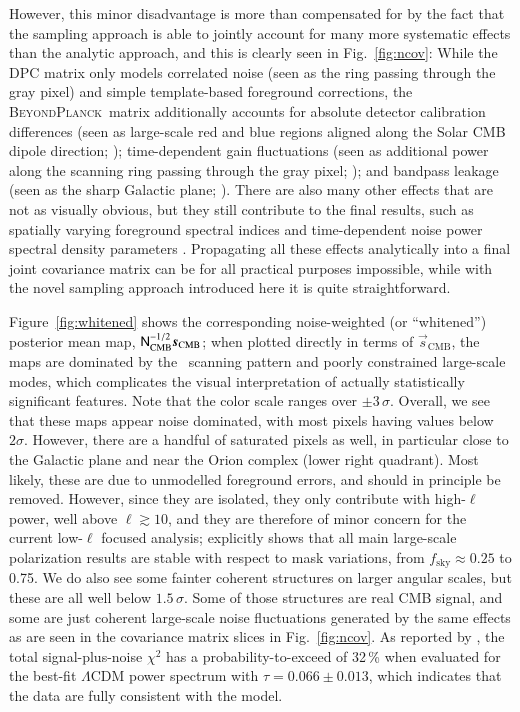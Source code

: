 \documentclass[twocolumn]{aa}
\newcommand{\s}[0]{\vec{s}}
\newcommand{\N}[0]{\tens{N}}
\newcommand{\BP}{\textsc{BeyondPlanck}}
\begin{document}
However, this minor disadvantage is more than compensated for by the
fact that the sampling approach is able to jointly account for many
more systematic effects than the analytic approach, and this is
clearly seen in Fig.~\ref{fig:ncov}: While the DPC matrix only models
correlated noise (seen as the ring passing through the gray pixel) and
simple template-based foreground corrections, the \BP\ matrix
additionally accounts for absolute detector calibration differences
(seen as large-scale red and blue regions aligned along the Solar CMB
dipole direction; \citealp{bp07,bp10}); time-dependent gain
fluctuations (seen as additional power along the scanning ring passing
through the gray pixel; \citealp{bp07}); and bandpass leakage (seen as
the sharp Galactic plane; \citealp{bp09}). There are also many other
effects that are not as visually obvious, but they still contribute to
the final results, such as spatially varying foreground spectral
indices \citep{bp13,bp14} and time-dependent noise power spectral
density parameters \citep{bp06}. Propagating all these effects
analytically into a final joint covariance matrix can be for all practical
purposes impossible, while with the novel sampling approach introduced
here it is quite straightforward.

Figure~\ref{fig:whitened} shows the corresponding noise-weighted (or
``whitened'') posterior mean map,
$\N_{\mathrm{CMB}}^{-1/2}\s_{\mathrm{CMB}}$; when plotted directly in
terms of $\s_{\mathrm{CMB}}$, the maps are dominated by the
\Planck\ scanning pattern and poorly constrained large-scale modes,
which complicates the visual interpretation of actually statistically
significant features. Note that the color scale ranges over
$\pm3\,\sigma$. Overall, we see that these maps appear noise
dominated, with most pixels having values below $2\sigma$. However,
there are a handful of saturated pixels as well, in particular close
to the Galactic plane and near the Orion complex (lower right
quadrant). Most likely, these are due to unmodelled foreground errors,
and should in principle be removed. However, since they are isolated,
they only contribute with high-$\ell$ power, well above
$\ell\gtrsim10$, and they are therefore of minor concern for the
current low-$\ell$ focused analysis; \citet{bp12} explicitly shows
that all main large-scale polarization results are stable with respect
to mask variations, from $f_{\mathrm{sky}}\approx0.25$ to 0.75. We do
also see some fainter coherent structures on larger angular scales,
but these are all well below $1.5\,\sigma$. Some of those structures
are real CMB signal, and some are just coherent large-scale noise
fluctuations generated by the same effects as are seen in the
covariance matrix slices in Fig.~\ref{fig:ncov}. As reported by
\citet{bp12}, the total signal-plus-noise $\chi^2$ has a
probability-to-exceed of 32\,\% when evaluated for the best-fit
$\Lambda$CDM power spectrum with $\tau=0.066\pm0.013$, which indicates
that the data are fully consistent with the model.
\end{document}

